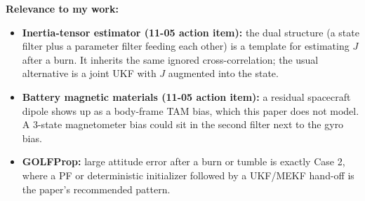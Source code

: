 \documentclass[11pt]{article}
\begin{document}
\textbf{Relevance to my work:}
\begin{itemize}[noitemsep]
    \item \textbf{Inertia-tensor estimator (11-05 action item):} the dual structure (a state filter plus a parameter filter feeding each other) is a template for estimating $J$ after a burn. It inherits the same ignored cross-correlation; the usual alternative is a joint UKF with $J$ augmented into the state.
    \item \textbf{Battery magnetic materials (11-05 action item):} a residual spacecraft dipole shows up as a body-frame TAM bias, which this paper does not model. A 3-state magnetometer bias could sit in the second filter next to the gyro bias.
    \item \textbf{GOLFProp:} large attitude error after a burn or tumble is exactly Case 2, where a PF or deterministic initializer followed by a UKF/MEKF hand-off is the paper's recommended pattern.
\end{itemize}
\end{document}
